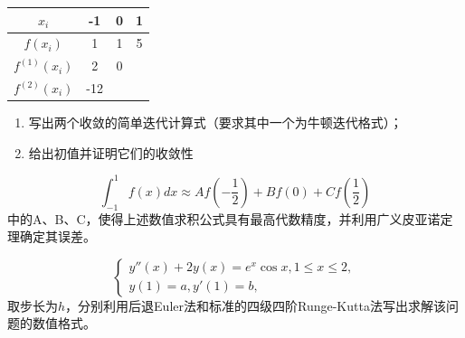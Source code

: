 \documentclass[12pt,a4paper]{article}
\begin{document}
\vspace{18cm}

\newpage
{}

\begin{center}
\begin{tabular}{|c|c|c|c|}
\hline
$x_i$ & -1 & 0 & 1 \\
\hline
$f(x_i)$ & 1 & 1 & 5 \\
\hline
$f^{(1)}(x_i)$ & 2 & 0 & \\
\hline
$f^{(2)}(x_i)$ & -12 & & \\
\hline
\end{tabular}
\end{center}

\vspace{18cm}

\newpage
{}

\vspace{18cm}

\newpage
{}
\begin{enumerate}
\item[1)] 写出两个收敛的简单迭代计算式（要求其中一个为牛顿迭代格式）；
\item[2)] 给出初值并证明它们的收敛性
\end{enumerate}

\vspace{18cm}

\newpage
{}
$$\int_{-1}^1 f(x)dx \approx Af(-\frac{1}{2}) + Bf(0) + Cf(\frac{1}{2})$$
\noindent 中的A、B、C，使得上述数值求积公式具有最高代数精度，并利用广义皮亚诺定理确定其误差。

\vspace{18cm}

\newpage
{}

\vspace{18cm}

\newpage
{}
$$\begin{cases}
y''(x) + 2y(x) = e^x \cos x, 1 \leq x \leq 2, \\
y(1) = a, y'(1) = b,
\end{cases}$$
\noindent 取步长为$h$，分别利用后退Euler法和标准的四级四阶Runge-Kutta法写出求解该问题的数值格式。

\vspace{18cm}
\end{document}
